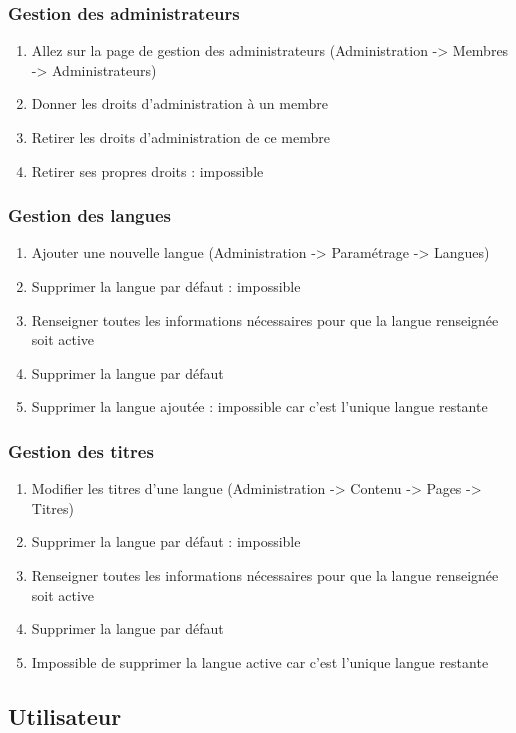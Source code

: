 \documentclass[11pt]{report}
\begin{document}
\subsubsection*{Gestion des administrateurs}
\begin{enumerate}
 \item Allez sur la page de gestion des administrateurs (Administration -> Membres -> Administrateurs)
 \item Donner les droits d’administration à un membre
 \item Retirer les droits d’administration de ce membre
 \item Retirer ses propres droits : impossible
\end{enumerate}

\subsubsection*{Gestion des langues}
\begin{enumerate}
 \item Ajouter une nouvelle langue (Administration -> Paramétrage -> Langues)
 \item Supprimer la langue par défaut : impossible
 \item Renseigner toutes les informations nécessaires pour que la langue renseignée soit active
 \item Supprimer la langue par défaut
 \item Supprimer la langue ajoutée : impossible car c'est l'unique langue restante
\end{enumerate}

\subsubsection*{Gestion des titres}
\begin{enumerate}
 \item Modifier les titres d'une langue (Administration -> Contenu -> Pages -> Titres)
 \item Supprimer la langue par défaut : impossible
 \item Renseigner toutes les informations nécessaires pour que la langue renseignée soit active
 \item Supprimer la langue par défaut
 \item Impossible de supprimer la langue active car c'est l'unique langue restante
\end{enumerate}

\subsection{Utilisateur}
\end{document}
